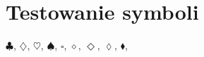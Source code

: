 \documentclass[a4paper,11pt]{article}
\begin{document}
\section{Testowanie symboli}

\label{sec:Testowanie-symboli}



\noindent
$\clubsuit$, $\diamondsuit$, $\heartsuit$, $\spadesuit$, \quad
$\square$, $\diamond$, $\Diamond$, $\lozenge$, $\blacklozenge$,










\end{document}
